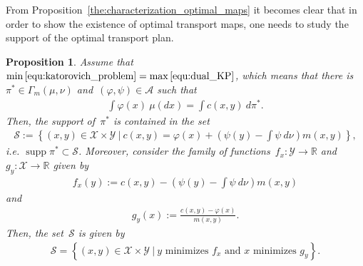 \documentclass{article}
\newtheorem{proposition}[theorem]{Proposition}
\theoremstyle{definition}
\DeclareMathOperator{\supp}{supp}
\def\cS{\mathcal{S}}
\begin{document}
    
    From Proposition~\ref{the:characterization_optimal_maps} it becomes clear that in order to show the existence of optimal transport maps, one needs to study the support of the optimal transport plan.
    
    
 \begin{proposition}\label{the:characterization_support_optimal_transport_plan}
          Assume that~$\min \eqref{equ:katorovich_problem} = \max \eqref{equ:dual_KP}$, which means that there is~$\pi^* \in \Gamma_{m} (\mu, \nu)$ and~$(\varphi, \psi) \in \mathcal{A}$ such that
    \begin{align}\label{equ:strong_duality_specific}
       \int \varphi(x) \  \mu(dx) = \int c(x,y)  \ d  \pi^*.
    \end{align}
        Then, the support of~$\pi^*$  is contained in the set
        \begin{align}\label{equ:support_pi_contained_in_c_convex_set}
            \cS :=  \left\{ (x,y) \in \mathcal{X} \times \mathcal{Y} \ | \ c(x,y) = \varphi(x) + \left( \psi(y) - \int \psi \ d \nu \right) m(x,y) \right\},
        \end{align} 
        i.e. $\supp \pi^* \subset \cS$. 
        Moreover, consider the family of functions~$f_x: \mathcal{Y} \to \mathbb{R}$ and~$g_y: \mathcal{X} \to \mathbb{R}$ given by 
        \begin{align}\label{equ:criterion_optimal_transport_map}
            f_x(y):= c(x,y) - \left(\psi(y)- \int \psi \ d \nu \right) m(x,y)
        \end{align}
        and
        \begin{align}\label{equ:criterion_dual_optimal_transport_map}
            g_y(x):= \frac{ c(x,y) - \varphi(x)}{m(x,y)}.
        \end{align}
        Then, the set~$\cS$ is given by
        \begin{align}\label{equ:support_pi_characterized via minima}
            \cS = \left\lbrace (x,y) \in \mathcal{X} \times \mathcal{Y} \ | \ y \mbox{ minimizes } f_x \mbox{ and } x \mbox{ minimizes } g_y \right\rbrace.
        \end{align}
        
    \end{proposition}
\end{document}
